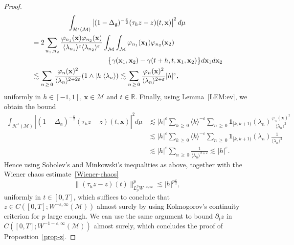 \documentclass[10pt]{amsart}
\theoremstyle{definition}\newtheorem{defi}[theo]{Definition}\newtheorem{rema}[theo]{Remark}\newtheorem{exam}[theo]{Example}\newtheorem{exem}[theo]{Example}\newtheorem{nota}[theo]{Notation}
\renewcommand{\th}{\tau_h}
\newcommand{\R}{\mathbb{R}}
\newcommand{\x}{\mathbf{x}}
\newcommand{\ind}{\mathbf{1}}
\newcommand{\M}{\mathcal{M}}
\renewcommand{\H}{\mathcal{H}}
\newcommand{\g}{\mathfrak{g}}
\newcommand{\Dlg}{\Delta_{\g}}
\newcommand{\eps}{\varepsilon}
\newcommand{\dt}{\partial_t}
\newcommand{\les}{\lesssim}
\newcommand{\jb}[1] {\langle #1 \rangle}
\begin{document}
\begin{proof}
\begin{multline*}
\int_{\H^s(\M)}\left|(1-\Dlg)^{-\frac\eps2}(\th z-z)(t,\x)\right|^2d\mu\\
\begin{aligned}
& =2\sum_{n_1,n_2}\frac{\varphi_{n_1}(\x)\varphi_{n_2}(\x)}{\jb{\lambda_{n_1}}^{\eps}\jb{\lambda_{n_2}}^{\eps}}\int_{\M}\int_{\M}\varphi_{n_1}(\x_1)\varphi_{n_2}(\x_2)\\
&\mkern200mu\big\{\gamma(\x_1,\x_2)-\gamma(t+h,t,\x_1,\x_2)\big\}d\x_1d\x_2\\
&\les \sum_{n\,\geq\,0}\frac{\varphi_n(\x)^2}{\jb{\lambda_n}^{2+2\eps}}(1\wedge |h|\jb{\lambda_n}) \les \sum_{n\,\geq\,0} \frac{\varphi_n(\x)^2}{\jb{\lambda_n}^{2+\eps}} |h|^{\eps},
\end{aligned}
\end{multline*}
uniformly in $h\in [-1,1]$, $\x\in\M$ and $t\in\R$. Finally, using Lemma~\ref{LEM:ev}, we obtain the bound
\begin{align*}
\int_{\H^s(\M)}\left|(1-\Dlg)^{-\frac\eps2}(\th z-z)(t,\x)\right|^2d\mu &\les |h|^{\eps}\sum_{k\,\geq\,0}\jb{k}^{-\eps} \sum_{n\,\geq\,0} \ind_{[k,k+1)}(\lambda_n)\frac{\varphi_n(\x)^2}{\jb{\lambda_n}^{2}}\\
&\les |h|^{\eps}\sum_{k\,\geq\,0}\jb{k}^{-\eps} \sum_{n\,\geq\,0} \ind_{[k,k+1)}(\lambda_n)\frac{1}{\jb{\lambda_n}^{2}}\\
&\les |h|^{\eps}\sum_{n\,\geq\,0} \frac{1}{\jb{\lambda_n}^{2+\eps}}\les |h|^{\eps}.
\end{align*}
Hence using Sobolev's and Minkowski's inequalities as above, together with the Wiener chaos estimate~\eqref{Wiener-chaos}
\begin{equation}\label{kolmogorov}
\|(\th z-z)(t)\|_{L^p_{\mu}W^{-\eps,\infty} }^p \les |h|^{p\frac{\eps}{2}},
\end{equation}
uniformly in $t\in[0,T]$, which suffices to conclude that $z\in C([0,T];W^{-\eps,\infty}(\M))$ almost surely by using Kolmogorov's continuity criterion for $p$ large enough. We can use the same argument to bound $\dt z$ in $C([0,T];W^{-1-\eps,\infty}(\M))$ almost surely, which concludes the proof of Proposition~\ref{prop-z}.
\end{proof}
\end{document}
